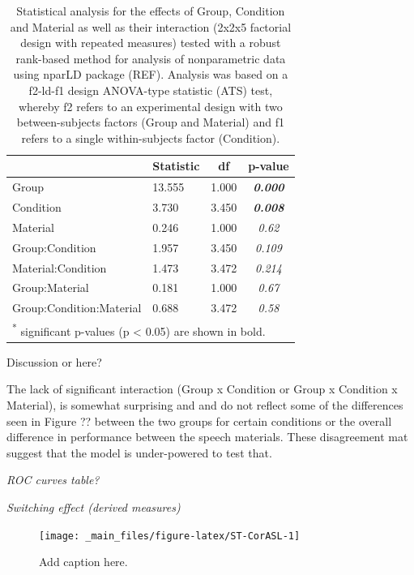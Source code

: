\documentclass[a4paper, twoside]{templates/ociamthesis}
\begin{document}
\begin{table}

\caption{\label{tab:ST-Tab-nparLD}Statistical analysis for the effects of Group, Condition and Material as well as their interaction (2x2x5 factorial design with repeated measures) tested with a robust rank-based method for analysis of nonparametric data using nparLD package (REF). Analysis was based on a f2-ld-f1 design ANOVA-type statistic (ATS) test, whereby f2 refers to an experimental design with two between-subjects factors (Group and Material) and f1 refers to a single within-subjects factor (Condition).}
\centering
\begin{tabular}[t]{llc>{}c}
\toprule
  & Statistic & df & p-value\\
\midrule
Group & 13.555 & 1.000 & \em{\textbf{0.000}}\\
Condition & 3.730 & 3.450 & \em{\textbf{0.008}}\\
Material & 0.246 & 1.000 & \em{0.62}\\
Group:Condition & 1.957 & 3.450 & \em{0.109}\\
Material:Condition & 1.473 & 3.472 & \em{0.214}\\
Group:Material & 0.181 & 1.000 & \em{0.67}\\
Group:Condition:Material & 0.688 & 3.472 & \em{0.58}\\
\bottomrule
\multicolumn{4}{l}{\textsuperscript{*} significant p-values (p < 0.05) are shown in bold.}\\
\end{tabular}
\end{table}

\colorbox[HTML]{CCCCFF}{Discussion or here?}

The lack of significant interaction (Group x Condition or Group x Condition x Material), is somewhat surprising and and do not reflect some of the differences seen in Figure ?? between the two groups for certain conditions or the overall difference in performance between the speech materials. These disagreement mat suggest that the model is under-powered to test that.

\colorbox[HTML]{CCCCFF}{\emph{ROC curves table?}}

\colorbox[HTML]{CCCCFF}{\emph{Switching effect (derived measures)}}

\begin{figure}

{\centering \texttt{[image: \_main\_files/figure-latex/ST-CorASL-1]} 

}

\caption{Add caption here.}\label{fig:ST-CorASL}
\end{figure}
\end{document}
